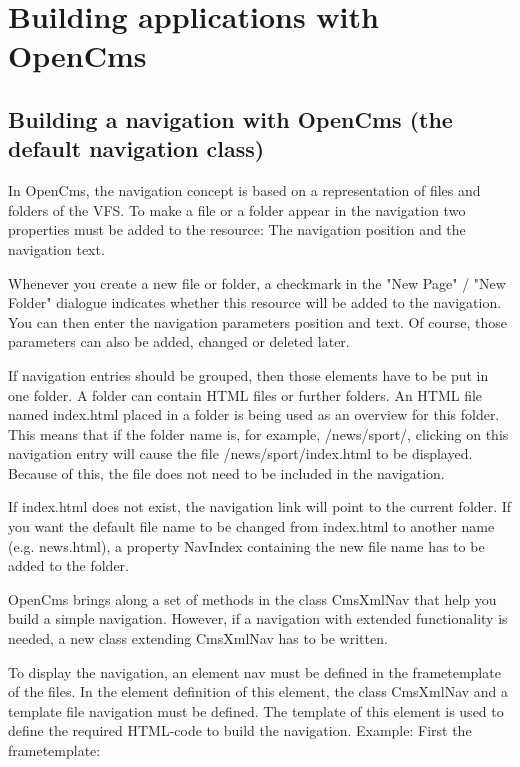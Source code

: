 \chapter{Building applications with OpenCms}

\section{Building a navigation with OpenCms (the default navigation class)}

In OpenCms, the navigation concept is based on a representation of files and
folders of the VFS. To make a file or a folder appear 
in the navigation two properties must be added to the resource: 
The navigation position and the navigation text.

Whenever you create a new file or folder, a checkmark in the 
"New Page" / "New Folder" dialogue indicates whether this 
resource will be added to the navigation. You can then enter the 
navigation parameters position and text. Of course, those 
parameters can also be added, changed or deleted later.

If navigation entries should be grouped, then those elements have 
to be put in one folder. A folder can contain HTML files or 
further folders. An HTML file named index.html placed in a folder 
is being used as an overview for this folder. This means that if 
the folder name is, for example, {\dir /news/sport/}, clicking 
on this navigation entry will cause the file {\dir /news/sport/index.html} 
to be displayed. Because of this, the file does not need to be
included in the navigation.

If index.html does not exist, the navigation link will point to
the current folder. If you want the default file name to be changed
from index.html to another name (e.g. news.html), a property 
{\name NavIndex} containing the new file name has to be added to
the folder.

OpenCms brings along a set of methods in the class CmsXmlNav that
help you build a simple navigation. However, if a navigation with
extended functionality is needed, a new class extending CmsXmlNav
has to be written.

To display the navigation, an element {\name nav} must be defined
in the frametemplate of the files. In the element definition of
this element, the class CmsXmlNav and a template file {\name
navigation} must be defined. The template of this element is used
to define the required HTML-code to build the navigation. Example:
First the frametemplate:

